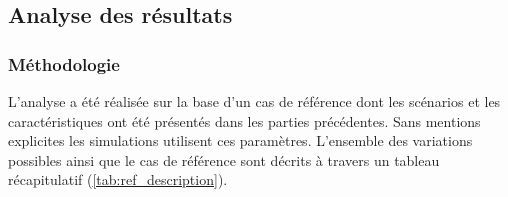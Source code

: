 \subsection{Analyse des résultats} %
\label{sub:analyse_des_resultats}

\subsubsection{Méthodologie} %
\label{ssub:methodologie}
L’analyse a été réalisée sur la base d’un cas de référence dont les scénarios et les
caractéristiques ont été présentés dans les parties précédentes. Sans mentions explicites les
simulations utilisent ces paramètres. L’ensemble des variations possibles ainsi que
le cas de référence sont décrits à travers un tableau récapitulatif (\autoref{tab:ref_description}).



